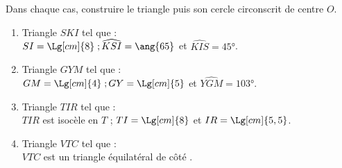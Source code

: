 \begin{exercice*}
   Dans chaque cas, construire le triangle puis son cercle circonscrit de centre $O$. \smallskip
   \begin{enumerate}
      \item Triangle $SKI$ tel que : \\ [1mm]
         $SI = \Lg[cm]{8} \; ; \widehat{KSI} =\ang{65}$ et $\widehat{KIS} =\ang{45}$. \smallskip
      \item Triangle $GYM$ tel que : \\ [1mm]
         $GM = \Lg[cm]{4} \; ; GY = \Lg[cm]{5}$ et $\widehat{YGM} = \ang{103}$. \smallskip
      \item Triangle $TIR$ tel que : \\ [1mm]
         $TIR$ est isocèle en $T$ ; $TI =\Lg[cm]{8}$ et $IR =\Lg[cm]{5,5}$. \smallskip
      \item Triangle $VTC$ tel que : \\
         $VTC$ est un triangle équilatéral de côté .
   \end{enumerate}
\end{exercice*}


